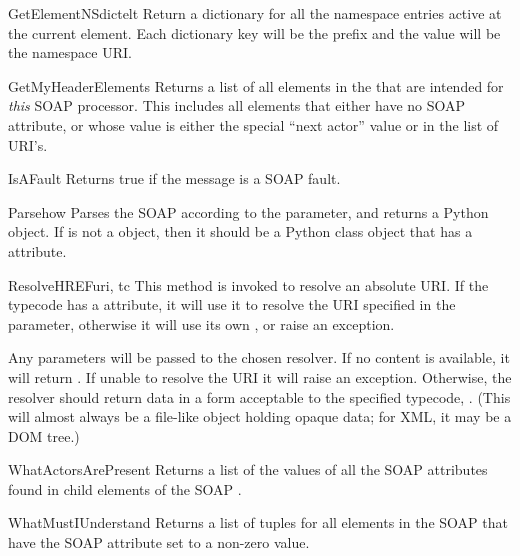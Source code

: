 \begin{methoddesc}{GetElementNSdict}{elt}
Return a dictionary for all the namespace entries active at the
current element. Each dictionary key will be the prefix and the value will
be the namespace URI.
\end{methoddesc}

\begin{methoddesc}{GetMyHeaderElements}{}
Returns a list of all elements in the  that are intended for
\emph{this} SOAP processor.
This includes all elements that either have no SOAP 
attribute, or whose value is either the special ``next actor'' value or
in the  list of URI's.
\end{methoddesc}

\begin{methoddesc}{IsAFault}{}
Returns true if the message is a SOAP fault.
\end{methoddesc}

\begin{methoddesc}{Parse}{how}
Parses the SOAP  according to the  parameter,
and returns a Python object.
If  is not a  object, then it should be a
Python class object that has a  attribute.
\end{methoddesc}

\begin{methoddesc}{ResolveHREF}{uri, tc}
This method is invoked to resolve an absolute URI.
If the typecode  has a  attribute, it will use it
to resolve the URI specified in the  parameter,
otherwise it will use its own , or raise an
 exception.

Any  parameters will be passed to the chosen resolver.
If no content is available, it will return .
If unable to resolve the URI it will raise an
 exception.
Otherwise, the resolver should return data in a form acceptable to the
specified typecode, .
(This will almost always be a file-like object holding opaque data;
for XML, it may be a DOM tree.)
\end{methoddesc}

\begin{methoddesc}{WhatActorsArePresent}{}
Returns a list of the values of all the SOAP  attributes
found in child elements of the SOAP .
\end{methoddesc}

\begin{methoddesc}{WhatMustIUnderstand}{}
Returns a list of  tuples for all elements in the
SOAP  that have the SOAP  attribute set
to a non-zero value.
\end{methoddesc}

